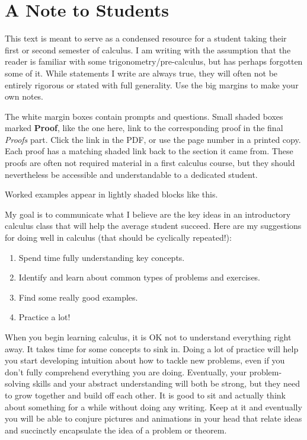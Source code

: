 
\section*{A Note to Students}
This text is meant to serve as a condensed resource for a student taking their first or second semester of calculus. I am writing with the assumption that the reader is familiar with some trigonometry/pre-calculus, but has perhaps forgotten some of it. While statements I write are always true, they will often not be entirely rigorous or stated with full generality. Use the big margins to make your own notes.  

The white margin boxes contain prompts and questions. Small shaded boxes
marked \textbf{Proof}, like the one here, link to the corresponding proof
in the final \textit{Proofs} part. Click the link in the PDF, or use the page
number in a printed copy. Each proof has a matching shaded link back to
the section it came from. These proofs are often not required material in a first calculus course, but they should nevertheless be accessible and understandable to a dedicated student.

\begin{exampleblock}
Worked examples appear in lightly shaded blocks like this.
\end{exampleblock}

My goal is to communicate what I believe are the key ideas in an introductory calculus class that will help the average student succeed. Here are my suggestions for doing well in calculus (that should be cyclically repeated!):

\begin{enumerate}
\item Spend time fully understanding key concepts.
\item Identify and learn about common types of problems and exercises.
\item Find some really good examples.
\item Practice a lot!
\end{enumerate}


When you begin learning calculus, it is OK not to understand everything right away. It takes time for some concepts to sink in. Doing a lot of practice will help you start developing intuition about how to tackle new problems, even if you don't fully comprehend everything you are doing. Eventually, your problem-solving skills and your abstract understanding will both be strong, but they need to grow together and build off each other. It is good to sit and actually think about something for a while without doing any writing. Keep at it and eventually you will be able to conjure pictures and animations in your head that relate ideas and succinctly encapsulate the idea of a problem or theorem.


